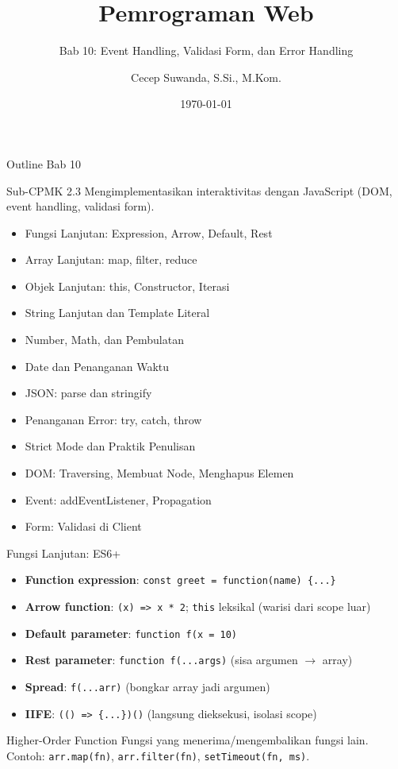 \documentclass[handout]{beamer}
\title[Bab 10 -- Event \& Validasi]{Pemrograman Web}
\subtitle{Bab 10: Event Handling, Validasi Form, dan Error Handling}
\author{Cecep Suwanda, S.Si., M.Kom.}
\institute{Universitas Bale Bandung}
\date{\today}
\begin{document}
\begin{frame}
	\titlepage
\end{frame}

\begin{frame}[shrink=15]{Outline Bab 10}
	\begin{block}{Sub-CPMK 2.3}
		Mengimplementasikan interaktivitas dengan JavaScript (DOM, event handling, validasi form).
	\end{block}
	\begin{itemize}
		\item Fungsi Lanjutan: Expression, Arrow, Default, Rest
		\item Array Lanjutan: map, filter, reduce
		\item Objek Lanjutan: this, Constructor, Iterasi
		\item String Lanjutan dan Template Literal
		\item Number, Math, dan Pembulatan
		\item Date dan Penanganan Waktu
		\item JSON: parse dan stringify
		\item Penanganan Error: try, catch, throw
		\item Strict Mode dan Praktik Penulisan
		\item DOM: Traversing, Membuat Node, Menghapus Elemen
		\item Event: addEventListener, Propagation
		\item Form: Validasi di Client
	\end{itemize}
\end{frame}

\begin{frame}{Fungsi Lanjutan: ES6+}
	\begin{itemize}
		\item \textbf{Function expression}: \texttt{const greet = function(name) \{...\}}
		\item \textbf{Arrow function}: \texttt{(x) => x * 2}; \texttt{this} leksikal (warisi dari scope luar)
		\item \textbf{Default parameter}: \texttt{function f(x = 10)}
		\item \textbf{Rest parameter}: \texttt{function f(...args)} (sisa argumen $\to$ array)
		\item \textbf{Spread}: \texttt{f(...arr)} (bongkar array jadi argumen)
		\item \textbf{IIFE}: \texttt{(() => \{...\})()} (langsung dieksekusi, isolasi scope)
	\end{itemize}
	\begin{block}{Higher-Order Function}
		Fungsi yang menerima/mengembalikan fungsi lain. Contoh: \texttt{arr.map(fn)}, \texttt{arr.filter(fn)}, \texttt{setTimeout(fn, ms)}.
	\end{block}
\end{frame}
\end{document}
